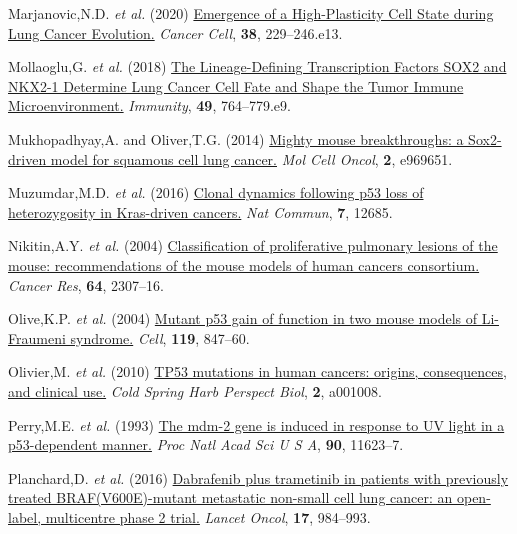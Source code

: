\begin{CSLReferences}{1}{0}
\leavevmode{}%
Marjanovic,N.D. \emph{et al.} (2020) \href{https://doi.org/10.1016/j.ccell.2020.06.012}{Emergence of a High-Plasticity Cell State during Lung Cancer Evolution.} \emph{Cancer Cell}, \textbf{38}, 229--246.e13.

\leavevmode{}%
Mollaoglu,G. \emph{et al.} (2018) \href{https://doi.org/10.1016/j.immuni.2018.09.020}{The Lineage-Defining Transcription Factors SOX2 and NKX2-1 Determine Lung Cancer Cell Fate and Shape the Tumor Immune Microenvironment.} \emph{Immunity}, \textbf{49}, 764--779.e9.

\leavevmode{}%
Mukhopadhyay,A. and Oliver,T.G. (2014) \href{https://doi.org/10.4161/23723548.2014.969651}{Mighty mouse breakthroughs: a Sox2-driven model for squamous cell lung cancer.} \emph{Mol Cell Oncol}, \textbf{2}, e969651.

\leavevmode{}%
Muzumdar,M.D. \emph{et al.} (2016) \href{https://doi.org/10.1038/ncomms12685}{Clonal dynamics following p53 loss of heterozygosity in Kras-driven cancers.} \emph{Nat Commun}, \textbf{7}, 12685.

\leavevmode{}%
Nikitin,A.Y. \emph{et al.} (2004) \href{https://doi.org/10.1158/0008-5472.can-03-3376}{Classification of proliferative pulmonary lesions of the mouse: recommendations of the mouse models of human cancers consortium.} \emph{Cancer Res}, \textbf{64}, 2307--16.

\leavevmode{}%
Olive,K.P. \emph{et al.} (2004) \href{https://doi.org/10.1016/j.cell.2004.11.004}{Mutant p53 gain of function in two mouse models of Li-Fraumeni syndrome.} \emph{Cell}, \textbf{119}, 847--60.

\leavevmode{}%
Olivier,M. \emph{et al.} (2010) \href{https://doi.org/10.1101/cshperspect.a001008}{TP53 mutations in human cancers: origins, consequences, and clinical use.} \emph{Cold Spring Harb Perspect Biol}, \textbf{2}, a001008.

\leavevmode{}%
Perry,M.E. \emph{et al.} (1993) \href{https://doi.org/10.1073/pnas.90.24.11623}{The mdm-2 gene is induced in response to UV light in a p53-dependent manner.} \emph{Proc Natl Acad Sci U S A}, \textbf{90}, 11623--7.

\leavevmode{}%
Planchard,D. \emph{et al.} (2016) \href{https://doi.org/10.1016/s1470-2045(16)30146-2}{Dabrafenib plus trametinib in patients with previously treated BRAF(V600E)-mutant metastatic non-small cell lung cancer: an open-label, multicentre phase 2 trial.} \emph{Lancet Oncol}, \textbf{17}, 984--993.


\end{CSLReferences}
